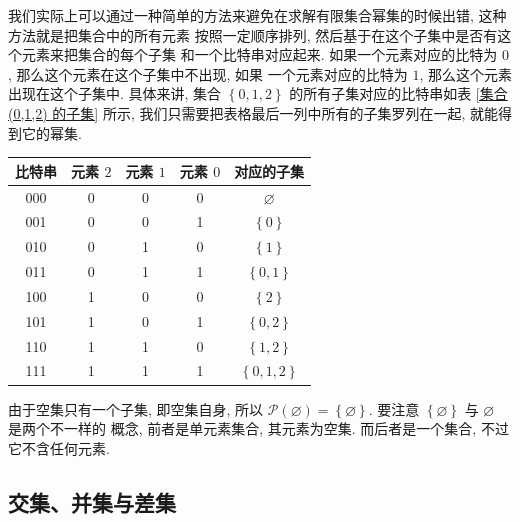 \documentclass[10pt,UTF8]{book} %
\begin{document}
我们实际上可以通过一种简单的方法来避免在求解有限集合幂集的时候出错, 这种方法就是把集合中的所有元素
按照一定顺序排列, 然后基于在这个子集中是否有这个元素来把集合的每个子集
和一个比特串对应起来. 如果一个元素对应的比特为 $0$, 那么这个元素在这个子集中不出现, 如果
一个元素对应的比特为 $1$, 那么这个元素出现在这个子集中. 具体来讲, 集合 $\left\{0,1,2\right\}$
的所有子集对应的比特串如表 \ref{集合 (0,1,2) 的子集} 所示, 我们只需要把表格最后一列中所有的子集罗列在一起,
就能得到它的幂集.
{ %
\label{集合 (0,1,2) 的子集}
\begin{longtable}{c|ccc|c}
    \hline
    \textbf{比特串} & \textbf{元素} $2$ & \textbf{元素} $1$ & \textbf{元素} $0$ & \textbf{对应的子集} \\
    \hline
    \endhead
    \hline
    \endfoot

    000 & 0 & 0 & 0 & $\varnothing$ \\ 
    001 & 0 & 0 & 1 & $\left\{ 0 \right\}$ \\
    010 & 0 & 1 & 0 & $\left\{ 1 \right\}$ \\ 
    011 & 0 & 1 & 1 & $\left\{ 0, 1 \right\}$ \\ 
    100 & 1 & 0 & 0 & $\left\{ 2 \right\}$ \\ 
    101 & 1 & 0 & 1 & $\left\{ 0, 2 \right\}$ \\ 
    110 & 1 & 1 & 0 & $\left\{ 1,2 \right\}$ \\ 
    111 & 1 & 1 & 1 & $\left\{ 0, 1, 2 \right\}$ \\
\end{longtable}}

\begin{example}
    由于空集只有一个子集, 即空集自身, 所以 $\mathcal{P}(\varnothing) = \left\{
        \varnothing
    \right\}$. 要注意 $\left\{ \varnothing \right\}$ 与 $\varnothing$ 是两个不一样的
    概念, 前者是单元素集合, 其元素为空集. 而后者是一个集合, 不过它不含任何元素.
\end{example}

\subsection{交集、并集与差集}
\end{document}
